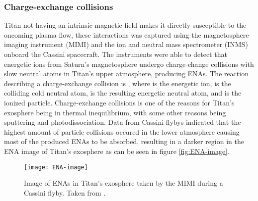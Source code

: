 \documentclass[12pt, parskip=full*, abstract]{scrartcl}
\begin{document}
\subsubsection{Charge-exchange collisions}
\parencite{titan-exosphere-interaction}
Titan not having an intrinsic magnetic field makes it directly susceptible to the oncoming plasma flow, these interactions was captured using the magnetosphere imaging instrument (MIMI) and the ion and neutral mass spectrometer (INMS) onboard the Cassini spacecraft. The instruments were able to detect that energetic ions from Saturn's magnetosphere undergo charge-change collisions with slow neutral atoms in Titan's upper atmosphere, producing ENAs. The reaction describing a charge-exchange collision is , where  is the energetic ion,  is the colliding cold neutral atom,  is the resulting energetic neutral atom, and  is the ionized particle. Charge-exchange collisions is one of the reasons for Titan's exosphere being in thermal inequilibrium, with some other reasons being sputtering and photodissociation. Data from Cassini flybys indicated that the highest amount of particle collisions occured in the lower atmosphere causing most of the produced ENAs to be absorbed, resulting in a darker region in the ENA image of Titan's exosphere as can be seen in figure \ref{fig:ENA-image}.

\begin{figure}[htbp]
	\centering
	\texttt{[image: ENA-image]}
	\caption{Image of ENAs in Titan's exosphere taken by the MIMI during a Cassini flyby. Taken from \textcite{titan-exosphere-interaction}.}
	\label{ENA-image}
\end{figure}

\end{document}
